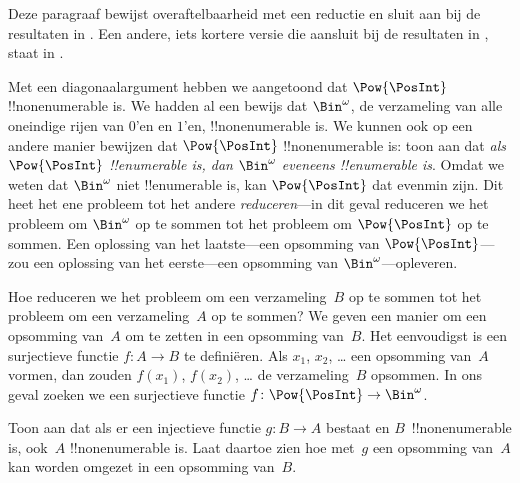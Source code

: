\documentclass[../../../include/open-logic-section]{subfiles}
\begin{document}


\begin{editorial}
  Deze paragraaf bewijst overaftelbaarheid met een reductie en sluit aan bij
  de resultaten in . Een andere, iets kortere versie die
  aansluit bij de resultaten in
  , staat in .
\end{editorial}

Met een diagonaalargument hebben we aangetoond dat $\Pow{\PosInt}$
!!{nonenumerable} is. We hadden al een bewijs dat $\Bin^\omega$, de
verzameling van alle oneindige rijen van $0$'en en $1$'en,
!!{nonenumerable} is. We kunnen ook op een andere manier bewijzen dat
$\Pow{\PosInt}$ !!{nonenumerable} is: toon aan dat \emph{als
$\Pow{\PosInt}$ !!{enumerable} is, dan $\Bin^\omega$ eveneens
!!{enumerable} is}. Omdat we weten dat $\Bin^\omega$ niet
!!{enumerable} is, kan $\Pow{\PosInt}$ dat evenmin zijn. Dit heet het
ene probleem tot het andere \emph{reduceren}---in dit geval reduceren we
het probleem om $\Bin^\omega$ op te sommen tot het probleem om
$\Pow{\PosInt}$ op te sommen. Een oplossing van het laatste---een
opsomming van $\Pow{\PosInt}$---zou een oplossing van het eerste---een
opsomming van $\Bin^\omega$---opleveren.

Hoe reduceren we het probleem om een verzameling~$B$ op te sommen tot
het probleem om een verzameling~$A$ op te sommen? We geven een manier
om een opsomming van~$A$ om te zetten in een opsomming van~$B$. Het
eenvoudigst is een surjectieve functie $f\colon A \to B$ te
definiëren. Als $x_1$, $x_2$, \dots{} een opsomming van~$A$ vormen,
dan zouden $f(x_1)$, $f(x_2)$, \dots{} de verzameling~$B$ opsommen. In
ons geval zoeken we een surjectieve functie $f\colon \Pow{\PosInt} \to
\Bin^\omega$.

\begin{prob}
Toon aan dat als er een injectieve functie $g\colon B \to A$ bestaat
en $B$~!!{nonenumerable} is, ook~$A$ !!{nonenumerable} is. Laat daartoe
zien hoe met~$g$ een opsomming van~$A$ kan worden omgezet in een
opsomming van~$B$.
\end{prob}
\end{document}
